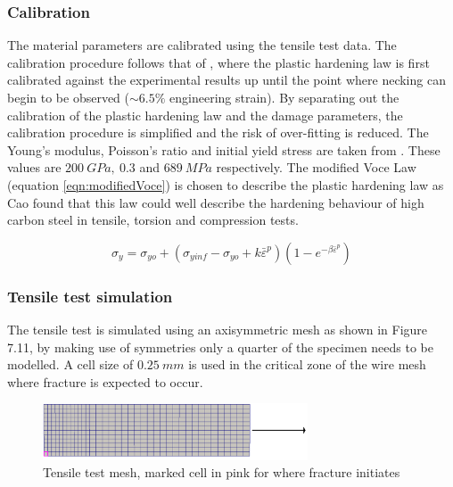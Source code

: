 \documentclass[sn-mathphys,Numbered,draft]{sn-jnl}%
\begin{document}
\subsubsection{Calibration}

The material parameters are calibrated using the tensile test data. The calibration procedure follows that of \citet{masse_study_2010}, where the plastic hardening law is first calibrated against the experimental results up until the point where necking can begin to be observed ($\sim6.5\%$ engineering strain). By separating out the calibration of the plastic hardening law and the damage parameters, the calibration procedure is simplified and the risk of over-fitting is reduced. The Young's modulus, Poisson's ratio and initial yield stress are taken from \citet{roh_process_2021}. These values are $200\ GPa,\ 0.3$ and $689\ MPa$ respectively. The modified Voce Law 
(equation \ref{eqn:modifiedVoce}) \cite{cao_modelling_2014} is chosen to describe the plastic hardening law as Cao \cite{cao_modelling_2014} found that this law could well describe the hardening behaviour of high carbon steel in tensile, torsion and compression tests. 

\begin{equation}
\label{eqn:modifiedVoce}
    \sigma_y=\sigma_{yo}+(\sigma_{yinf}-\sigma_{yo}+k\bar{\varepsilon}^p)(1-e^{-\beta\bar{\varepsilon}^p})
\end{equation}

\subsubsection{Tensile test simulation}

The tensile test is simulated using an axisymmetric mesh as shown in Figure 7.11, by making use of symmetries only a quarter of the specimen needs to be modelled. A cell size of $0.25\ mm$ is used in the critical zone of the wire mesh where fracture is expected to occur.

\begin{figure}[htb]
\begin{center}
	\includegraphics[width=0.7\textwidth]{./Figures/SimulationAndAnalysis/compareExperimentalSimulation/simTensileTest.png}
\caption{Tensile test mesh, marked cell in pink for where fracture initiates}
\label{fig:notchedRoundBAr}
\end{center}
\end{figure}
\end{document}

